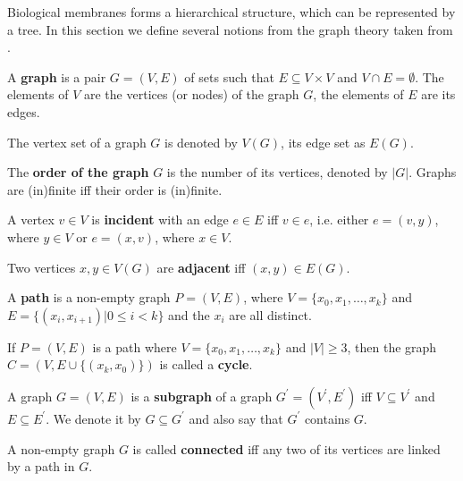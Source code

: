 Biological membranes forms a hierarchical structure, which can be represented by a tree. In this section we define several notions from the graph theory taken from \cite{Diestel97Graphs}.
\begin{definition}
  A {\bf graph} is a pair $G = (V,E)$ of sets such that $E\subseteq V\times V$ and $V\cap E = \emptyset$. The elements of $V$ are the vertices (or nodes) of the graph $G$, the elements of $E$ are its edges.
\end{definition}

The vertex set of a graph $G$ is denoted by $V(G)$, its edge set as $E(G)$.

\begin{definition}
  The {\bf order of the graph} $G$ is the number of its vertices, denoted by $|G|$. Graphs are (in)finite iff their order is (in)finite.
\end{definition}

\begin{definition}
  A vertex $v\in V$ is {\bf incident} with an edge $e\in E$ iff $v\in e$, i.e. either $e=(v,y)$, where $y\in V$ or $e=(x,v)$, where $x\in V$.
\end{definition}

\begin{definition}
  Two vertices $x,y\in V(G)$ are {\bf adjacent} iff $(x,y)\in E(G)$.
\end{definition}

\begin{definition}
  A {\bf path} is a non-empty graph $P=(V,E)$, where $V=\{x_0, x_1, \ldots, x_k\}$ and $E=\{(x_i,x_{i+1})|0\leq i < k\}$ and the $x_i$ are all distinct.
\end{definition}

\begin{definition}
  If $P=(V,E)$ is a path where $V=\{x_0, x_1, \ldots, x_k\}$ and $|V|\geq 3$, then the graph $C = (V,E\cup\{(x_k,x_0)\})$ is called a {\bf cycle}. 
\end{definition}

\begin{definition}
  A graph $G=(V,E)$ is a {\bf subgraph} of a graph $G^\prime = (V^\prime, E^\prime)$ iff $V\subseteq V^\prime$ and $E\subseteq E^\prime$. We denote it by $G\subseteq G^\prime$ and also say that $G^\prime$ contains $G$.
\end{definition}

\begin{definition}
  A non-empty graph $G$ is called {\bf connected} iff any two of its vertices are linked by a path in $G$.
\end{definition}

